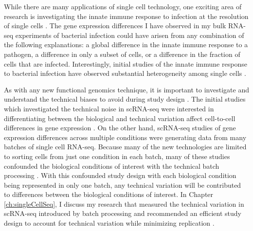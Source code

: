 While there are many applications of single cell technology, one
exciting area of research is investigating the innate immune response
to infection at the resolution of single cells \citep{Satija2014,
 Proserpio2016}. The gene expression differences I have observed in
my bulk RNA-seq experiments of bacterial infection could have arisen
from any combination of the following explanations: a global
difference in the innate immune response to a pathogen, a difference
in only a subset of cells, or a difference in the fraction of cells
that are infected. Interestingly, initial studies of the innate immune
response to bacterial infection have observed substantial
heterogeneity among single cells \citep{Shalek2013, Shalek2014, Avraham2015}.

As with any new functional genomics technique, it is important to
investigate and understand the technical biases to avoid during study
design \citep{Auer2010}. The initial studies which investigated the technical noise in
scRNA-seq were interested in differentiating between the biological
and technical variation affect cell-to-cell differences in gene
expression \citep{Brennecke2013, Grun2014, Islam2014, Ding2015, Vallejos2015}.
On the other hand, scRNA-seq studies of gene expression
differences across multiple conditions were generating data from many
batches of single cell RNA-seq. Because many of the new technologies
are limited to sorting cells from just one condition in each batch,
many of these studies confounded the biological conditions of interest
with the technical batch processing \citep{Hicks2015}. With this
confounded study design with each biological condition being
represented in only one batch, any technical variation will be
contributed to differences between the biological conditions of
interest. In Chapter \ref{ch:singleCellSeq}, I discuss my research
that measured the technical variation in scRNA-seq introduced by batch
processing and recommended an efficient study design to account for
technical variation while minimizing replication \citep{Tung2016}.
